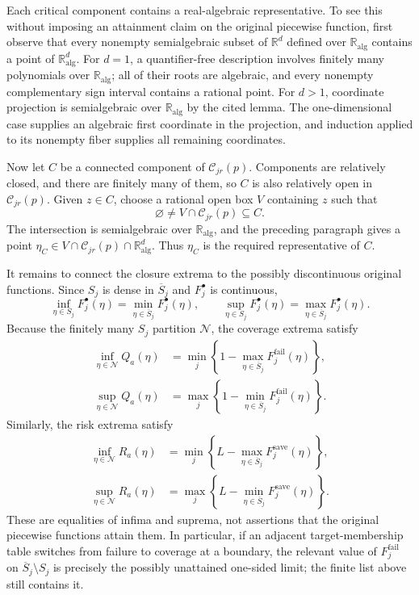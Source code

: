 Each critical component contains a real-algebraic representative.  To see this without imposing an attainment claim on the original piecewise function, first observe that every nonempty semialgebraic subset of \(\mathbb R^d\) defined over \(\mathbb R_{\mathrm{alg}}\) contains a point of \(\mathbb R_{\mathrm{alg}}^d\).  For \(d=1\), a quantifier-free description involves finitely many polynomials over \(\mathbb R_{\mathrm{alg}}\); all of their roots are algebraic, and every nonempty complementary sign interval contains a rational point.  For \(d>1\), coordinate projection is semialgebraic over \(\mathbb R_{\mathrm{alg}}\) by the cited lemma.  The one-dimensional case supplies an algebraic first coordinate in the projection, and induction applied to its nonempty fiber supplies all remaining coordinates.

Now let \(C\) be a connected component of \(\mathcal C_{jr}(p)\).  Components are relatively closed, and there are finitely many of them, so \(C\) is also relatively open in \(\mathcal C_{jr}(p)\).  Given \(z\in C\), choose a rational open box \(V\) containing \(z\) such that
\[
 \varnothing\ne V\cap\mathcal C_{jr}(p)\subseteq C.
\]
The intersection is semialgebraic over \(\mathbb R_{\mathrm{alg}}\), and the preceding paragraph gives a point \(\eta_C\in V\cap\mathcal C_{jr}(p)\cap\mathbb R_{\mathrm{alg}}^d\).  Thus \(\eta_C\) is the required representative of \(C\).

It remains to connect the closure extrema to the possibly discontinuous original functions.  Since \(S_j\) is dense in \(\overline S_j\) and \(F_j^\bullet\) is continuous,
\[
 \inf_{\eta\in S_j}F_j^\bullet(\eta)
 =\min_{\eta\in\overline S_j}F_j^\bullet(\eta),
 \qquad
 \sup_{\eta\in S_j}F_j^\bullet(\eta)
 =\max_{\eta\in\overline S_j}F_j^\bullet(\eta).
\]
Because the finitely many \(S_j\) partition \(\mathcal N\), the coverage extrema satisfy
\[
\begin{aligned}
\inf_{\eta\in\mathcal N}Q_a(\eta)
 &=\min_j\left\{1-
       \max_{\eta\in\overline S_j}F_j^{\mathrm{fail}}(\eta)\right\},\\
\sup_{\eta\in\mathcal N}Q_a(\eta)
 &=\max_j\left\{1-
       \min_{\eta\in\overline S_j}F_j^{\mathrm{fail}}(\eta)\right\}.
\end{aligned}
\]
Similarly, the risk extrema satisfy
\[
\begin{aligned}
\inf_{\eta\in\mathcal N}R_a(\eta)
 &=\min_j\left\{L-
       \max_{\eta\in\overline S_j}F_j^{\mathrm{save}}(\eta)\right\},\\
\sup_{\eta\in\mathcal N}R_a(\eta)
 &=\max_j\left\{L-
       \min_{\eta\in\overline S_j}F_j^{\mathrm{save}}(\eta)\right\}.
\end{aligned}
\]
These are equalities of infima and suprema, not assertions that the original piecewise functions attain them.  In particular, if an adjacent target-membership table switches from failure to coverage at a boundary, the relevant value of \(F_j^{\mathrm{fail}}\) on \(\overline S_j\setminus S_j\) is precisely the possibly unattained one-sided limit; the finite list above still contains it.

